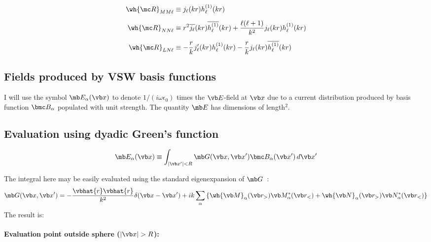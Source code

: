 \documentclass[letterpaper]{article}
\begin{document}
\begin{align*}
\wh{\mc R}_{MM\ell}&\equiv j_\ell(kr)h^{(1)}_\ell(kr)
\\[5pt]
\wh{\mc R}_{NN\ell}&\equiv 
  r^2 \overline{j_\ell}(kr) \overline{h^{(1)}_\ell}(kr)
 +\frac{\ell(\ell+1)}{k^2}j_\ell(kr) h^{(1)}_\ell(kr)
\\[5pt]
\wh{\mc R}_{LN\ell}&\equiv
  -\frac{r}{k}j^\prime_\ell(kr)h^{(1)}_\ell(kr)
  -\frac{r}{k}j_\ell(kr)\overline{h^{(1)}_\ell}(kr)
\end{align*}

\subsection{Fields produced by VSW basis functions}

I will use the symbol $\mb E_\alpha(\vb x)$ to denote
$1/(i\omega \epsilon_0)$ times the $\vb E$-field at $\vb x$
due to a current distribution produced by basis function $\bmc B_\alpha$
populated with unit strength.
The quantity $\mb E$ has dimensions of length$^2$.

\subsection*{Evaluation using dyadic Green's function}

$$ \mb E_\alpha(\vb x) \equiv
   \int_{|\vb x^\prime|<R} \mb G(\vb x, \vb x^\prime) \bmc B_\alpha(\vb x^\prime)
  \,d\vb x^\prime
$$

The integral here may be easily evaluated using the standard eigenexpansion
of $\mb G$~\cite{Tai,Collin}:
$$ \mb G(\vb x, \vb x^\prime)
   =-\frac{\vbhat{r} \vbhat{r}}{k^2}\delta(\vb x-\vb x^\prime)
   +ik\sum_{\alpha} 
     \left\{ \wh{\vb M}_\alpha(\vb r_>) \vb M_\alpha^*(\vb r_<)
            +\wh{\vb N}_\alpha(\vb r_>) \vb N_\alpha^*(\vb r_<)
     \right\}
$$
The result is:
\paragraph{Evaluation point outside sphere ($|\vb x|>R$):}
\end{document}
